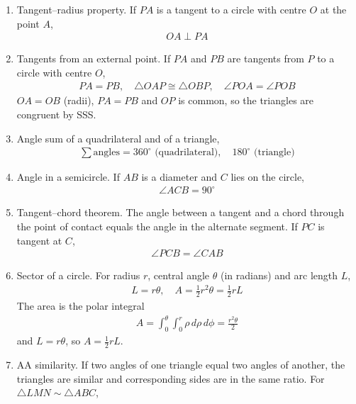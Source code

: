 \begin{enumerate}[label=\thesubsection.\arabic*, ref=\thesubsection.\theenumi]
\item Tangent--radius property. If $PA$ is a tangent to a circle with centre $O$ at the point $A$,
\begin{align}
	OA \perp PA \label{eq:CBSE25S2-tangent-radius}
\end{align}
\item Tangents from an external point. If $PA$ and $PB$ are tangents from $P$ to a circle with centre $O$,
\begin{align}
	PA = PB, \quad \triangle OAP \cong \triangle OBP, \quad \angle POA = \angle POB \label{eq:CBSE25S2-tangent-equal}
\end{align}
\solution
$OA = OB$ (radii), $PA = PB$ and $OP$ is common, so the triangles are congruent by SSS. 
\item Angle sum of a quadrilateral and of a triangle,
\begin{align}
	\sum \text{angles} = 360^\circ \text{ (quadrilateral)}, \quad 180^\circ \text{ (triangle)} \label{eq:CBSE25S2-angle-sum}
\end{align}
\item Angle in a semicircle. If $AB$ is a diameter and $C$ lies on the circle,
\begin{align}
	\angle ACB = 90^\circ \label{eq:CBSE25S2-semicircle}
\end{align}
\item Tangent--chord theorem. The angle between a tangent and a chord through the point of contact equals the angle in the alternate segment. If $PC$ is tangent at $C$,
\begin{align}
	\angle PCB = \angle CAB \label{eq:CBSE25S2-tangent-chord}
\end{align}
\item Sector of a circle. For radius $r$, central angle $\theta$ (in radians) and arc length $L$,
\begin{align}
	L = r\theta, \quad A = \frac{1}{2}r^2\theta = \frac{1}{2}rL \label{eq:CBSE25S2-sector}
\end{align}
\solution
The area is the polar integral
\begin{align}
	A = \int_0^{\theta}\int_0^{r}\rho\,d\rho\,d\phi = \frac{r^2\theta}{2}
\end{align}
and $L = r\theta$, so $A = \frac{1}{2}rL$. 
\item AA similarity. If two angles of one triangle equal two angles of another, the triangles are similar and corresponding sides are in the same ratio. For $\triangle LMN \sim \triangle ABC$,

\end{enumerate}
